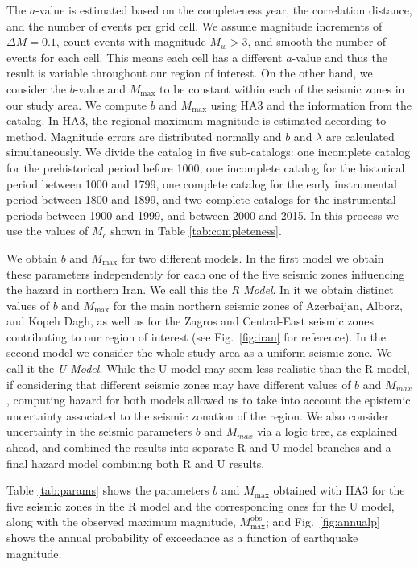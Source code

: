 The $a$-value is estimated based on the completeness year, the correlation distance, and the number of events per grid cell. We assume magnitude increments of $\Delta M = 0.1$, count events with magnitude $M_w > 3$, and smooth the number of events for each cell. This means each cell has a different $a$-value and thus the result is variable throughout our region of interest. On the other hand, we consider the $b$-value and $M_{\max}$ to be constant within each of the seismic zones in our study area. We compute $b$ and $M_{\max}$ using HA3 and the information from the catalog. In HA3, the regional maximum magnitude is estimated according to \citet{Kijko_1989_BSSA} method. Magnitude errors are distributed normally and $b$ and $\lambda$ are calculated simultaneously. We divide the catalog in five sub-catalogs: one incomplete catalog for the prehistorical period before 1000, one incomplete catalog for the historical period between 1000 and 1799, one complete catalog for the early instrumental period between 1800 and 1899, and two complete catalogs for the instrumental periods between 1900 and 1999, and between 2000 and 2015. In this process we use the values of $M_c$ shown in Table \ref{tab:completeness}.

We obtain $b$ and $M_{\max}$ for two different models. In the first model we obtain these parameters independently for each one of the five seismic zones influencing the hazard in northern Iran. We call this the \textit{R Model}. In it we obtain distinct values of $b$ and $M_{\max}$ for the main northern seismic zones of Azerbaijan, Alborz, and Kopeh Dagh, as well as for the Zagros and Central-East seismic zones contributing to our region of interest (see Fig.~\ref{fig:iran} for reference). In the second model we consider the whole study area as a uniform seismic zone. We call it the \textit{U Model}. While the U model may seem less realistic than the R model, if considering that different seismic zones may have different values of $b$ and $M_{max}$, computing hazard for both models allowed us to take into account the epistemic uncertainty associated to the seismic zonation of the region. We also consider uncertainty in the seismic parameters $b$ and $M_{max}$ via a logic tree, as explained ahead, and combined the results into separate R and U model branches and a final hazard model combining both R and U results.

Table \ref{tab:params} shows the parameters $b$ and $M_{\max}$ obtained with HA3 for the five seismic zones in the R model and the corresponding ones for the U model, along with the observed maximum magnitude, $M_{\max}^{\mathrm{obs}}$; and Fig.~\ref{fig:annualp} shows the annual probability of exceedance as a function of earthquake magnitude.
